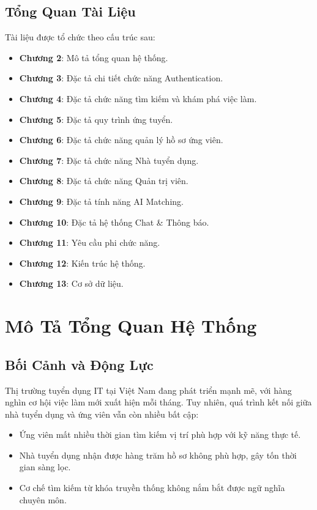 \documentclass[12pt, a4paper]{report}
\begin{document}
\section{Tổng Quan Tài Liệu}

Tài liệu được tổ chức theo cấu trúc sau:
\begin{itemize}
    \item \textbf{Chương 2}: Mô tả tổng quan hệ thống.
    \item \textbf{Chương 3}: Đặc tả chi tiết chức năng Authentication.
    \item \textbf{Chương 4}: Đặc tả chức năng tìm kiếm và khám phá việc làm.
    \item \textbf{Chương 5}: Đặc tả quy trình ứng tuyển.
    \item \textbf{Chương 6}: Đặc tả chức năng quản lý hồ sơ ứng viên.
    \item \textbf{Chương 7}: Đặc tả chức năng Nhà tuyển dụng.
    \item \textbf{Chương 8}: Đặc tả chức năng Quản trị viên.
    \item \textbf{Chương 9}: Đặc tả tính năng AI Matching.
    \item \textbf{Chương 10}: Đặc tả hệ thống Chat \& Thông báo.
    \item \textbf{Chương 11}: Yêu cầu phi chức năng.
    \item \textbf{Chương 12}: Kiến trúc hệ thống.
    \item \textbf{Chương 13}: Cơ sở dữ liệu.
\end{itemize}

\chapter{Mô Tả Tổng Quan Hệ Thống}

\section{Bối Cảnh và Động Lực}

Thị trường tuyển dụng IT tại Việt Nam đang phát triển mạnh mẽ, với hàng nghìn cơ hội việc làm mới xuất hiện mỗi tháng. Tuy nhiên, quá trình kết nối giữa nhà tuyển dụng và ứng viên vẫn còn nhiều bất cập:

\begin{itemize}
    \item Ứng viên mất nhiều thời gian tìm kiếm vị trí phù hợp với kỹ năng thực tế.
    \item Nhà tuyển dụng nhận được hàng trăm hồ sơ không phù hợp, gây tốn thời gian sàng lọc.
    \item Cơ chế tìm kiếm từ khóa truyền thống không nắm bắt được ngữ nghĩa chuyên môn.
\end{itemize}
\end{document}
